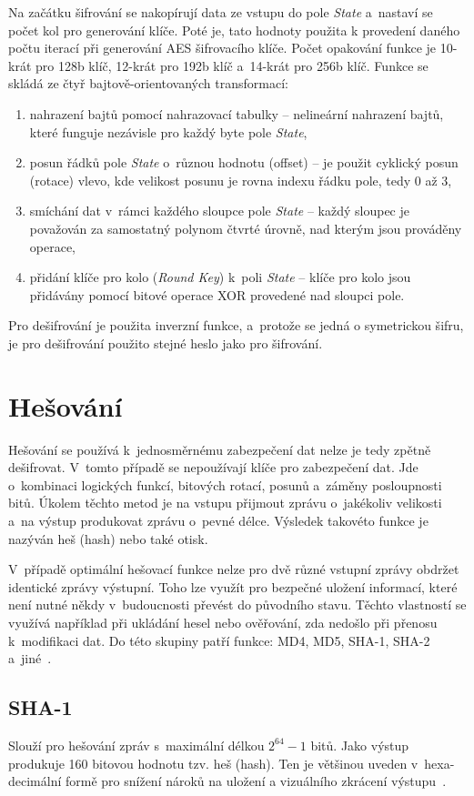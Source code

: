 Na začátku šifrování se nakopírují data ze vstupu do pole {\it State} a~nastaví se počet kol pro
generování klíče. Poté je, tato hodnoty použita k provedení daného počtu iterací při generování AES
šifrovacího klíče. Počet opakování funkce je 10-krát pro 128b klíč, 12-krát pro 192b klíč a~14-krát
pro 256b klíč. Funkce se skládá ze čtyř bajtově-orientovaných transformací:
    \begin{enumerate}
    \item nahrazení bajtů pomocí nahrazovací tabulky -- nelineární nahrazení bajtů, které funguje
        nezávisle pro každý byte pole {\it State},
    \item posun řádků pole {\it State} o~různou hodnotu (offset) -- je použit cyklický posun
        (rotace) vlevo, kde velikost posunu je rovna indexu řádku pole, tedy 0 až 3,
    \item smíchání dat v~rámci každého sloupce pole {\it State} -- každý sloupec je považován za
        samostatný polynom čtvrté úrovně, nad kterým jsou prováděny operace,
    \item přidání klíče pro kolo ({\it Round Key}) k~poli {\it State} -- klíče pro kolo jsou
	přidávány pomocí bitové operace XOR provedené nad sloupci pole.
\end{enumerate}
Pro dešifrování je použita inverzní funkce, a~protože se jedná o symetrickou šifru, je pro dešifrování
použito stejné heslo jako pro šifrování.

\section{Hešování}
Hešování se používá k~jednosměrnému zabezpečení dat nelze je tedy zpětně dešifrovat. V~tomto případě
se nepoužívají klíče pro zabezpečení dat. Jde o~kombinaci logických funkcí, bitových rotací, posunů
a~záměny posloupnosti bitů. Úkolem těchto metod je na vstupu přijmout zprávu o~jakékoliv velikosti
a~na výstup produkovat zprávu o~pevné délce. Výsledek takovéto funkce je nazýván heš (hash) nebo
také otisk. 

 V~případě optimální hešovací funkce nelze pro dvě různé vstupní zprávy obdržet identické zprávy
výstupní. Toho lze využít pro bezpečné uložení informací, které není nutné někdy v~budoucnosti
převést do původního stavu. Těchto vlastností se využívá například při ukládání hesel nebo
ověřování, zda nedošlo při přenosu k~modifikaci dat. Do této skupiny patří funkce: MD4, MD5, SHA-1,
SHA-2 a~jiné~\cite{AC:1996}.

\subsection{SHA-1}
Slouží pro hešování zpráv s~maximální délkou $2^{64}-1$ bitů. Jako výstup produkuje 160 bitovou
hodnotu tzv. heš (hash). Ten je většinou uveden v~hexa-decimální formě pro snížení nároků na uložení
a vizuálního zkrácení výstupu~\cite{NIST:2015}. 

